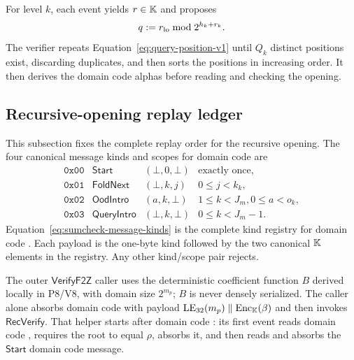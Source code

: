For level $k$, each  event yields $r\in\mathbb K$ and proposes
\begin{equation}
 q:=r_{\mathrm{lo}}\bmod 2^{h_k+r_k}.
 \label{eq:query-position-v1}
\end{equation}
The verifier repeats Equation~\eqref{eq:query-position-v1} until $Q_k$
distinct positions exist, discarding duplicates, and then sorts the positions
in increasing order.  It then derives the domain code  alphas before
reading and checking the opening.

\subsection{Recursive-opening replay ledger}
\label{sec:wire-recursive-ledger}

This subsection fixes the complete replay order for the recursive opening.
The four canonical message kinds and scopes for domain code  are
\begin{equation}
 \begin{array}{ccll}
  \mathtt{0x00}&\mathsf{Start}&(\bot,0,\bot)&\text{exactly once},\\
  \mathtt{0x01}&\mathsf{FoldNext}&(\bot,k,j)&0\le j<k_k,\\
  \mathtt{0x02}&\mathsf{OodIntro}&(a,k,\bot)&1\le k<J_m, 0\le a<o_k,\\
  \mathtt{0x03}&\mathsf{QueryIntro}&(\bot,k,\bot)&0\le k<J_m-1.
 \end{array}
 \label{eq:sumcheck-message-kinds}
\end{equation}
Equation~\eqref{eq:sumcheck-message-kinds} is the complete kind registry for
domain code .  Each payload is the one-byte kind followed by the
two canonical $\mathbb K$
elements in the registry.  Any other kind/scope pair rejects.

The outer $\mathsf{VerifyF2Z}$ caller uses the deterministic coefficient
function $B$ derived locally in P8/V8, with domain size
$2^{m_p}$; $B$ is never densely serialized.  The caller alone absorbs domain code
 with payload
$\operatorname{LE}_{32}(m_p)\parallel\operatorname{Enc}_{\mathbb K}(\beta)$ and then invokes
$\mathsf{RecVerify}$.  That helper starts after domain code : its
first event reads domain code , requires the root to equal $\rho$, absorbs
it, and then reads and absorbs the $\mathsf{Start}$ domain code  message.

